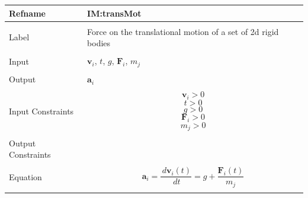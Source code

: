 \documentclass[12pt]{article}
\begin{document}
\noindent \begin{minipage}{\textwidth}
          \begin{tabular}{>{\raggedright}p{}>{\raggedright\arraybackslash}p{}}
          \toprule \textbf{Refname} & \textbf{IM:transMot}
          \label{IM:transMot}
          \\ \midrule \\
          Label & Force on the translational motion of a set of 2d rigid bodies
          \\ \midrule \\
          Input & ${\mathbf{v}_{i}}$, $t$, $g$, ${\mathbf{F}_{i}}$, ${m_{j}}$
          \\ \midrule \\
          Output & ${\mathbf{a}_{i}}$
          \\ \midrule \\
          Input Constraints & \begin{displaymath}
                              {\mathbf{v}_{i}}>0
                              \end{displaymath}
                              \begin{displaymath}
                              t>0
                              \end{displaymath}
                              \begin{displaymath}
                              g>0
                              \end{displaymath}
                              \begin{displaymath}
                              {\mathbf{F}_{i}}>0
                              \end{displaymath}
                              \begin{displaymath}
                              {m_{j}}>0
                              \end{displaymath}
          \\ \midrule \\
          Output Constraints & 
          \\ \midrule \\
          Equation & \begin{displaymath}
                     {\mathbf{a}_{i}}=\frac{\,d{\mathbf{v}_{i}}\left(t\right)}{\,dt}=g+\frac{{\mathbf{F}_{i}}\left(t\right)}{{m_{j}}}
                     \end{displaymath}
          \\ \midrule \\

\end{tabular}
\end{minipage}
\end{document}

